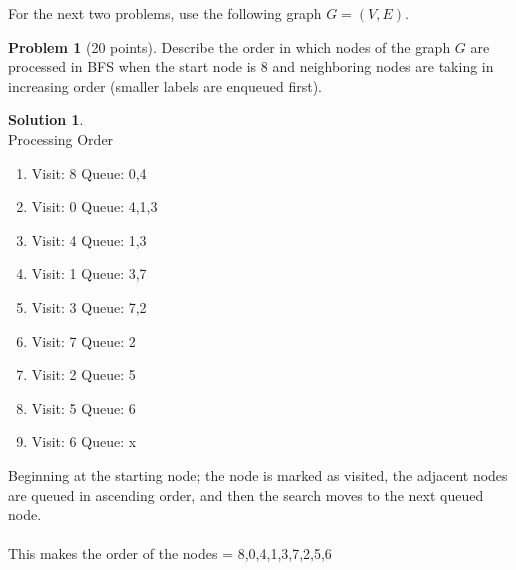 \documentclass{article}
\theoremstyle{definition}
\newtheorem{problem}{Problem}
\newtheorem*{solution}{Solution}
\begin{document}
\newpage

For the next two problems, use the following graph $G=(V,E)$. 
\begin{center}
\end{center}
\begin{problem}[20 points]
Describe the order in which nodes of the graph $G$ are processed in
BFS when the start node is 8 and neighboring nodes are taking in
increasing order (smaller labels are enqueued first). 
\end{problem}
\begin{solution} \\
Processing Order
\begin{enumerate}
    \item Visit: 8   Queue: 0,4
    \item Visit: 0   Queue: 4,1,3
    \item Visit: 4   Queue: 1,3
    \item Visit: 1   Queue: 3,7
    \item Visit: 3   Queue: 7,2
    \item Visit: 7   Queue: 2
    \item Visit: 2   Queue: 5
    \item Visit: 5   Queue: 6
    \item Visit: 6   Queue: x
\end{enumerate}
Beginning at the starting node; the node is marked as visited, the adjacent nodes are queued in ascending order, and then the search moves to the next queued node.\\
\\
This makes the order of the nodes = 8,0,4,1,3,7,2,5,6\\
\end{solution}
\end{document}

